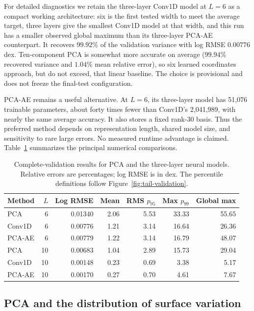 For detailed diagnostics we retain the three-layer Conv1D model at $L=6$
as a compact working architecture: six is the first tested width to meet the
average target, three layers give the smallest Conv1D model at that width,
and this run has a smaller observed global maximum than its three-layer
PCA-AE counterpart. It recovers $99.92\%$ of the validation variance with
log RMSE $0.00776$ dex. Ten-component PCA is somewhat more accurate on
average ($99.94\%$ recovered variance and $1.04\%$ mean relative error),
so six learned coordinates approach, but do not exceed, that linear
baseline. The choice is provisional and does not freeze the final-test
configuration.

PCA-AE remains a useful alternative. At $L=6$, its three-layer model has
51,076 trainable parameters, about forty times fewer than Conv1D's
2,041,989, with nearly the same average accuracy. It also stores a fixed
rank-30 basis. Thus the preferred method depends on representation length,
shared model size, and sensitivity to rare large errors. No measured
runtime advantage is claimed. Table~\ref{tab:validation-results}
summarizes the principal numerical comparisons.

\begin{table}[!htbp]
\centering
\caption{Complete-validation results for PCA and the three-layer neural
models. Relative errors are percentages; log RMSE is in dex. The
percentile definitions follow Figure~\ref{fig:tail-validation}.}
\label{tab:validation-results}
\small
\setlength{\tabcolsep}{5pt}
\begin{tabular}{@{}lrrrrrr@{}}
\toprule
Method & $L$ & Log RMSE & Mean & RMS $p_{95}$ & Max $p_{99}$ & Global max \\
\midrule
PCA & 6 & 0.01340 & 2.06 & 5.53 & 33.33 & 55.65 \\
Conv1D & 6 & 0.00776 & 1.21 & 3.14 & 16.64 & 26.36 \\
PCA-AE & 6 & 0.00779 & 1.22 & 3.14 & 16.79 & 48.07 \\
\midrule
PCA & 10 & 0.00683 & 1.04 & 2.89 & 15.73 & 29.04 \\
Conv1D & 10 & 0.00148 & 0.23 & 0.69 & 3.38 & 5.17 \\
PCA-AE & 10 & 0.00170 & 0.27 & 0.70 & 4.61 & 7.67 \\
\bottomrule
\end{tabular}
\end{table}

\FloatBarrier
\subsection{PCA and the distribution of surface variation}
\label{sec:results-pca}

